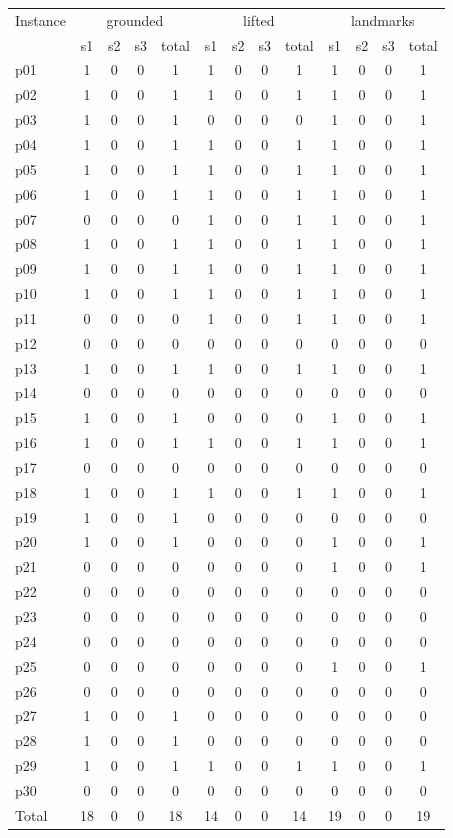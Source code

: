 \begin{tabular}{l|cccc|cccc|cccc}
\hline
Instance & \multicolumn{4}{c}{grounded} & \multicolumn{4}{c}{lifted} & \multicolumn{4}{c}{landmarks} \\
 & s1 & s2 & s3 & total & s1 & s2 & s3 & total & s1 & s2 & s3 & total \\
\hline
p01 & 1 & 0 & 0 & 1 & 1 & 0 & 0 & 1 & 1 & 0 & 0 & 1 \\
p02 & 1 & 0 & 0 & 1 & 1 & 0 & 0 & 1 & 1 & 0 & 0 & 1 \\
p03 & 1 & 0 & 0 & 1 & 0 & 0 & 0 & 0 & 1 & 0 & 0 & 1 \\
p04 & 1 & 0 & 0 & 1 & 1 & 0 & 0 & 1 & 1 & 0 & 0 & 1 \\
p05 & 1 & 0 & 0 & 1 & 1 & 0 & 0 & 1 & 1 & 0 & 0 & 1 \\
p06 & 1 & 0 & 0 & 1 & 1 & 0 & 0 & 1 & 1 & 0 & 0 & 1 \\
p07 & 0 & 0 & 0 & 0 & 1 & 0 & 0 & 1 & 1 & 0 & 0 & 1 \\
p08 & 1 & 0 & 0 & 1 & 1 & 0 & 0 & 1 & 1 & 0 & 0 & 1 \\
p09 & 1 & 0 & 0 & 1 & 1 & 0 & 0 & 1 & 1 & 0 & 0 & 1 \\
p10 & 1 & 0 & 0 & 1 & 1 & 0 & 0 & 1 & 1 & 0 & 0 & 1 \\
p11 & 0 & 0 & 0 & 0 & 1 & 0 & 0 & 1 & 1 & 0 & 0 & 1 \\
p12 & 0 & 0 & 0 & 0 & 0 & 0 & 0 & 0 & 0 & 0 & 0 & 0 \\
p13 & 1 & 0 & 0 & 1 & 1 & 0 & 0 & 1 & 1 & 0 & 0 & 1 \\
p14 & 0 & 0 & 0 & 0 & 0 & 0 & 0 & 0 & 0 & 0 & 0 & 0 \\
p15 & 1 & 0 & 0 & 1 & 0 & 0 & 0 & 0 & 1 & 0 & 0 & 1 \\
p16 & 1 & 0 & 0 & 1 & 1 & 0 & 0 & 1 & 1 & 0 & 0 & 1 \\
p17 & 0 & 0 & 0 & 0 & 0 & 0 & 0 & 0 & 0 & 0 & 0 & 0 \\
p18 & 1 & 0 & 0 & 1 & 1 & 0 & 0 & 1 & 1 & 0 & 0 & 1 \\
p19 & 1 & 0 & 0 & 1 & 0 & 0 & 0 & 0 & 0 & 0 & 0 & 0 \\
p20 & 1 & 0 & 0 & 1 & 0 & 0 & 0 & 0 & 1 & 0 & 0 & 1 \\
p21 & 0 & 0 & 0 & 0 & 0 & 0 & 0 & 0 & 1 & 0 & 0 & 1 \\
p22 & 0 & 0 & 0 & 0 & 0 & 0 & 0 & 0 & 0 & 0 & 0 & 0 \\
p23 & 0 & 0 & 0 & 0 & 0 & 0 & 0 & 0 & 0 & 0 & 0 & 0 \\
p24 & 0 & 0 & 0 & 0 & 0 & 0 & 0 & 0 & 0 & 0 & 0 & 0 \\
p25 & 0 & 0 & 0 & 0 & 0 & 0 & 0 & 0 & 1 & 0 & 0 & 1 \\
p26 & 0 & 0 & 0 & 0 & 0 & 0 & 0 & 0 & 0 & 0 & 0 & 0 \\
p27 & 1 & 0 & 0 & 1 & 0 & 0 & 0 & 0 & 0 & 0 & 0 & 0 \\
p28 & 1 & 0 & 0 & 1 & 0 & 0 & 0 & 0 & 0 & 0 & 0 & 0 \\
p29 & 1 & 0 & 0 & 1 & 1 & 0 & 0 & 1 & 1 & 0 & 0 & 1 \\
p30 & 0 & 0 & 0 & 0 & 0 & 0 & 0 & 0 & 0 & 0 & 0 & 0 \\
\hline
Total & 18 & 0 & 0 & 18 & 14 & 0 & 0 & 14 & 19 & 0 & 0 & 19 \\
\hline
\end{tabular}
